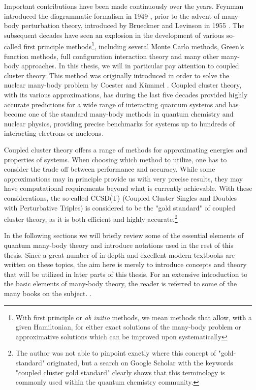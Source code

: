 Important contributions have been made continuously over the
years. Feynman introduced the diagrammatic formalism in
1949 \cite{ShavittBartlett2009}, prior to the advent of many-body
perturbation theory, introduced by Brueckner and Levinson in
1955 \cite{ShavittBartlett2009}.  The subsequent decades have seen an
explosion in the development of various so-called first principle
methods\footnote{With first principle or {\em ab initio} methods, we
mean methods that allow, with a given Hamiltonian, for either exact
solutions of the many-body problem or approximative solutions which
can be improved upon systematically}, including several Monte Carlo
methods, Green's function methods, full configuration interaction
theory and many other many-body approaches. In this thesis, we will in particular pay
attention to coupled cluster theory. This method was originally
introduced in order to solve the nuclear many-body problem by Coester
and Kümmel \cite{Kummel}.  Coupled cluster theory, with its various
approximations, has during the last five decades provided highly
accurate predictions for a wide range of interacting quantum systems
and has become one of the standard many-body methods in quantum
chemistry and nuclear physics, providing precise benchmarks for
systems up to hundreds of interacting electrons or nucleons.

Coupled cluster theory offers a range of methods for approximating energies and
properties of systems. When choosing which method to utilize, one has
to consider the trade off between performance and accuracy. While some
approximations  may in principle provide us with very precise results, they may
have computational requirements beyond what is currently
achievable. With these considerations, the so-called 
CCSD(T) (Coupled Cluster Singles and Doubles with Perturbative
Triples) is considered to be the "gold standard" of coupled cluster theory, as it is
both efficient and highly accurate.\footnote{The author was not able
to pinpoint exactly where this concept of "gold-standard" originated,
but a search on Google Scholar with the keywords "coupled cluster gold
standard" clearly shows that this terminology is commonly used within
the quantum chemistry community.}

In the following sections we will briefly review some of the essential elements of quantum many-body theory and
introduce notations used in the rest of this thesis. Since a great  number of in-depth and
excellent modern textbooks are written on these topics, the aim here 
is merely to introduce concepts and theory that will be utilized in
later parts of this thesis. For an extensive introduction to the basic elements of many-body theory, 
the reader is referred to some of the many books on the
subject. \cite{ShavittBartlett2009, Szabo, Harris, GrossRungeHeinonen,Thijssen}.


